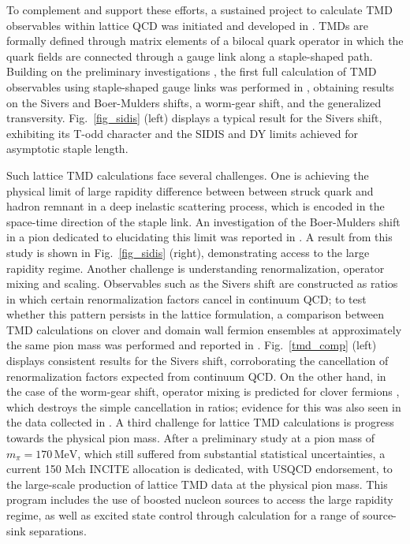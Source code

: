 To complement and support these efforts, a sustained
project to calculate TMD observables within lattice QCD was initiated
and developed in \cite{Hagler:2009mb,Musch:2010ka,Musch:2011er,Engelhardt:2015xja,Yoon:2017qzo,Engelhardt:2017miy}.
TMDs are formally defined through matrix elements of a bilocal quark
operator in which the quark fields are connected through a gauge link
along a staple-shaped path. Building on the preliminary investigations
\cite{Hagler:2009mb,Musch:2010ka}, the first full calculation of TMD
observables using staple-shaped gauge links was performed in
\cite{Musch:2011er}, obtaining results on the Sivers and Boer-Mulders
shifts, a worm-gear shift, and the generalized transversity.
Fig.~\ref{fig_sidis} (left) displays a typical result for the Sivers
shift, exhibiting its T-odd character and the SIDIS and DY limits
achieved for asymptotic staple length.

Such lattice TMD calculations face several challenges. One is achieving
the physical limit of large rapidity difference between between struck
quark and hadron remnant in a deep inelastic scattering process, which
is encoded in the space-time direction of the staple link. An investigation
of the Boer-Mulders shift in a pion dedicated to elucidating this limit
was reported in \cite{Engelhardt:2015xja}. A result from this study is
shown in Fig.~\ref{fig_sidis} (right), demonstrating access to the large
rapidity regime. Another challenge is understanding renormalization,
operator mixing and scaling. Observables such as the Sivers shift are
constructed as ratios in which certain renormalization factors cancel
in continuum QCD; to test whether this pattern persists in the lattice
formulation, a comparison between TMD calculations on clover and domain
wall fermion ensembles at approximately the same pion mass was performed
and reported in \cite{Yoon:2017qzo}. Fig.~\ref{tmd_comp} (left) displays
consistent results for the Sivers shift, corroborating the cancellation
of renormalization factors expected from continuum QCD. On the other hand,
in the case of the worm-gear shift, operator mixing is predicted for
clover fermions \cite{Constantinou:2017sej}, which destroys the simple
cancellation in ratios; evidence for this was also seen in the data
collected in \cite{Yoon:2017qzo}. A third challenge for lattice TMD
calculations is progress towards the physical pion mass. After a
preliminary study \cite{Engelhardt:2015czw}
at a pion mass of $m_{\pi } = 170\, \mbox{MeV} $,
which still suffered from substantial statistical uncertainties,
a current 150 Mch INCITE allocation is dedicated, with USQCD endorsement,
to the large-scale production of lattice TMD data at the physical pion mass.
This program includes the use of boosted nucleon sources to access the
large rapidity regime, as well as excited state control through
calculation for a range of source-sink separations.

